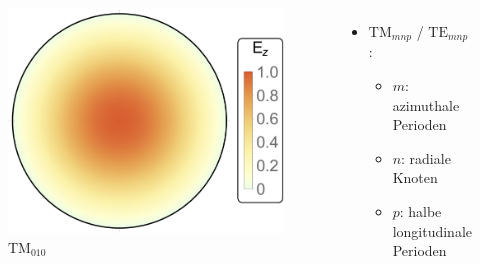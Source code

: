 \documentclass[12pt,xcolor=dvipsnames,professionalfonts]{beamer}
\begin{document}
\begin{frame}[t]
	\begin{columns}[T]
		\begin{figure}[h]
			\centering
			\hspace*{0.70cm}\includegraphics[scale=0.4]{./figures/tm010.pdf}
			\vspace*{-0.2cm}
			\caption{$\mathrm{TM}_{010}$}
		\end{figure}
			\begin{itemize}
				\item $\mathrm{TM}_{mnp}$ / $\mathrm{TE}_{mnp}$:
				\begin{itemize}
					\setlength\itemsep{0.25em}
					\item $m$: azimuthale Perioden
					\item $n$: radiale Knoten
					\item $p$: halbe longitudinale Perioden
				\end{itemize}
			\end{itemize}
		

\end{columns}
\end{frame}
\end{document}
